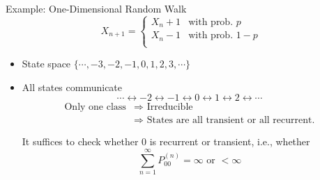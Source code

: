\documentclass[letterpaper, mathserif]{beamer}
\def\p{\mathrm P}
\def\E{\mathbb E}
\def\Sum{\sum\nolimits}
\def\X{\mathfrak{X}}
\begin{document}
%
%
%
\begin{frame}{Example: One-Dimensional Random Walk}
$$
X_{n+1}=
\begin{cases}
X_n+1 &\text{with prob. } p\\
X_n-1 &\text{with prob. } 1-p\\
\end{cases}
$$
\begin{itemize}
\item State space $\{\cdots, -3, -2, -1, 0, 1, 2, 3,\cdots\}$
\item All states communicate
$$
\cdots \longleftrightarrow-2\longleftrightarrow -1 \longleftrightarrow 0\longleftrightarrow 1\longleftrightarrow 2\longleftrightarrow\cdots
$$
\begin{align*}
\text{Only one class} &\Rightarrow\text{ Irreducible}\\
&\Rightarrow\text{ States are all transient or all recurrent.}
\end{align*}

It suffices to check whether 0 is recurrent or transient, i.e., whether
$$
\sum_{n=1}^{\infty}P^{(n)}_{00}=\infty \text{ or } <\infty
$$
\end{itemize}
\end{frame}
\end{document}
